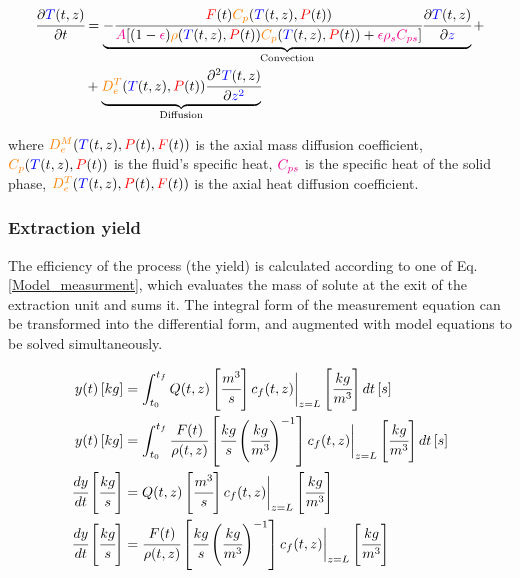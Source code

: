 \documentclass[../Parameter_fitting.tex]{subfiles}
\begin{document}
			{\footnotesize
				\begin{equation} \label{Model_heat}
					\begin{split}
						\cfrac{\partial {\color{blue}T}(t,z)}{\partial t} &= 
						\underbrace{ -\cfrac{{\color{red}F}(t) {\color{orange}C_p}({\color{blue}T}(t,z),{\color{red}P}(t))}{{\color{magenta}A} 	[(1-{\color{magenta}\epsilon}){\color{orange}\rho}({\color{blue}T}(t,z),{\color{red}P}(t)) {\color{orange}C_p} ({\color{blue}T}(t,z),{\color{red}P}(t)) + {\color{magenta} \epsilon \rho_s C_{ps} } ]} \cfrac{\partial {\color{blue}T}(t,z)}{\partial {\color{blue}z}}  }_{\text{Convection}} + \\
						& + \underbrace{ {\color{orange}D^T_e}({\color{blue}T}(t,z),{\color{red}P}(t)) \cfrac{\partial^2 {\color{blue}T}(t,z)}{\partial {\color{blue}z^2}} }_{\text{Diffusion}}
					\end{split}
			\end{equation} }
			
			where $ {\color{orange}D^M_e}({\color{blue}T}(t,z),{\color{red}P}(t),{\color{red}F}(t))$ is the axial mass diffusion coefficient, ${\color{orange}C_p}({\color{blue}T}(t,z),{\color{red}P}(t))$ is the fluid's specific heat, ${\color{magenta}C_{ps}}$ is the specific heat of the solid phase, ${\color{orange}D^T_e}({\color{blue}T}(t,z),{\color{red}P}(t),{\color{red}F}(t))$ is the axial heat diffusion coefficient.
			
			\subsubsection{Extraction yield} \label{CH: Yield}
			
			The efficiency of the process (the yield) is calculated according to one of Eq. \ref{Model_measurment}, which evaluates the mass of solute at the exit of the extraction unit and sums it. The integral form of the measurement equation can be transformed into the differential form, and augmented with model equations to be solved simultaneously.
			
			{\footnotesize
				\begin{align} 
					\label{Model_measurment}
					y(t) \left[ kg \right] &= \int_{t_0}^{t_f} Q(t,z) \left[ \cfrac{m^3}{s} \right] c_f(t,z) \biggr\rvert_{z=L} \left[ \cfrac{kg}{m^3} \right] dt \left[ s \right] \\
					y(t) \left[ kg \right] &= \int_{t_0}^{t_f} \cfrac{F(t)}{\rho(t,z)} \left[ \cfrac{kg}{s} \left( \cfrac{kg}{m^3} \right)^{-1} \right] c_f(t,z) \biggr\rvert_{z=L} \left[ \cfrac{kg}{m^3} \right] dt \left[ s \right] 	\\
					\cfrac{dy}{dt} \left[ \cfrac{kg}{s} \right] &= Q(t,z) \left[ \cfrac{m^3}{s} \right] c_f(t,z) \biggr\rvert_{z=L} \left[ \cfrac{kg}{m^3} \right]  \\
					\cfrac{dy}{dt} \left[ \cfrac{kg}{s} \right] &= \cfrac{F(t)}{\rho(t,z)} \left[ \cfrac{kg}{s} \left( \cfrac{kg}{m^3} \right)^{-1} \right] c_f(t,z) \biggr\rvert_{z=L} \left[ \cfrac{kg}{m^3} \right]
			\end{align}	}
			
\end{document}
